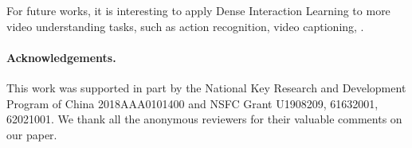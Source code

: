 \documentclass[10pt,twocolumn,letterpaper]{article}
\begin{document}
For future works, it is interesting to apply Dense Interaction Learning to more video understanding tasks, such as action recognition, video captioning, \etc.

\vspace{-1mm}
\paragraph{Acknowledgements.} This work was supported in part by the National Key Research and Development Program of China 2018AAA0101400 and NSFC Grant U1908209, 61632001, 62021001. We thank all the anonymous reviewers for their valuable comments on our paper.

{\small


}
\end{document}
